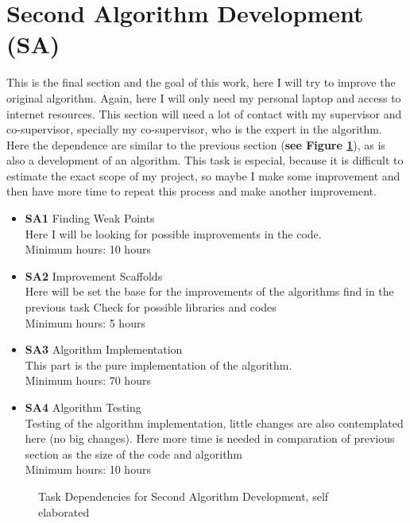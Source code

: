 \section{Second Algorithm Development \textbf{(SA)}}
This is the final section and the goal of this work, here I will try to improve the original algorithm.
Again, here I will only need my personal laptop and access to internet resources.
This section will need a lot of contact with my supervisor and co-supervisor, specially my co-supervisor, who is the expert in the algorithm.
Here the dependence are similar to the previous section (\textbf{see Figure \ref{SA_dependences}}), as is also a development of an algorithm.
This task is especial, because it is difficult to estimate the exact scope of my project, so maybe I make some improvement and then have more time to repeat this process and make another improvement.
\begin{itemize}
    \item \textbf{SA1} Finding Weak Points \\
        Here I will be looking for possible improvements in the code.\\
        Minimum hours: 10 hours
        \item \textbf{SA2} Improvement Scaffolds \\
        Here will be set the base for the improvements of the algorithms find in the previous task
        Check for possible libraries and codes \\
        Minimum hours: 5 hours
    \item \textbf{SA3} Algorithm Implementation\\
        This part is the pure implementation of the algorithm. \\
        Minimum hours: 70 hours
    \item \textbf{SA4} Algorithm Testing \\
        Testing of the algorithm implementation, little changes are also contemplated here (no big changes).
        Here more time is needed in comparation of previous section as the size of the code and algorithm\\
        Minimum hours: 10 hours
\end{itemize}
\begin{figure}[h]
    \centering
    \caption{Task Dependencies for Second Algorithm Development, self elaborated}
    \label{SA_dependences}
\end{figure}

